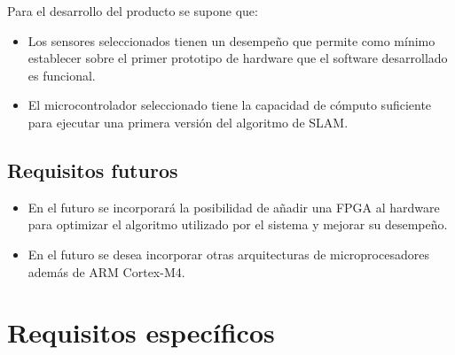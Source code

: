 \documentclass[12pt,a4paper, twosite]{article}
\begin{document}
Para el desarrollo del producto se supone que:

\begin{itemize}
  \item Los sensores seleccionados tienen un desempeño que permite como mínimo establecer sobre
  el primer prototipo de hardware que el software desarrollado es funcional.
  \item El microcontrolador seleccionado tiene la capacidad de cómputo suficiente para ejecutar
  una primera versión del algoritmo de SLAM.
\end{itemize}


\subsection{Requisitos futuros}
\label{sec:org33cfcdb}


\begin{itemize}
  \item En el futuro se incorporará la posibilidad de añadir una FPGA al hardware para optimizar el
  algoritmo utilizado por el sistema y mejorar su desempeño.
  \item En el futuro se desea incorporar otras arquitecturas de microprocesadores además de
  ARM Cortex-M4.
\end{itemize}

\section{Requisitos específicos}
\label{sec:org40573d1}



\end{document}
